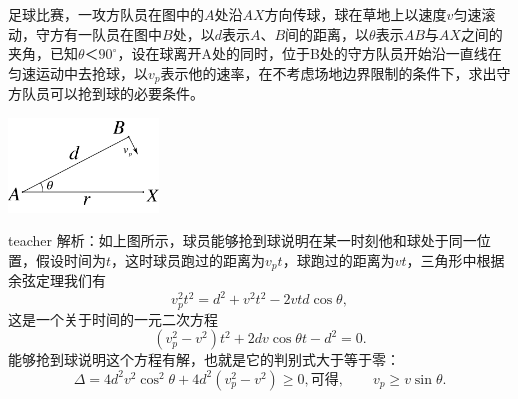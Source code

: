 \begin{example}
足球比赛，一攻方队员在图中的$A$处沿$AX$方向传球，球在草地上以速度$v$匀速滚动，守方有一队员在图中$B$处，以$d$表示$A$、$B$间的距离，以$\theta$表示$AB$与$AX$之间的夹角，已知$\theta ＜90^\circ$，设在球离开A处的同时，位于B处的守方队员开始沿一直线在匀速运动中去抢球，以$v_p$表示他的速率，在不考虑场地边界限制的条件下，求出守方队员可以抢到球的必要条件。

%
\begin{flushright}
\includegraphics[width = 0.3\textwidth]{images/motion-problem-football.pdf}
\end{flushright}
\begin{taggedblock}{teacher}
\vspace*{4cm}
\noindent
解析：如上图所示，球员能够抢到球说明在某一时刻他和球处于同一位置，假设时间为$t$，这时球员跑过的距离为$v_pt$，球跑过的距离为$vt$，三角形中根据余弦定理我们有
\[
v_p^2t^2 = d^2+v^2t^2-2vtd\cos\theta,
\]
这是一个关于时间的一元二次方程
\[
(v_p^2-v^2)t^2+2dv\cos\theta t-d^2=0.
\]
能够抢到球说明这个方程有解，也就是它的判别式大于等于零：
\[
\Delta  = 4d^2v^2\cos^2\theta+4d^2(v_p^2-v^2)\ge 0,\text{可得},\qquad v_p\ge v\sin\theta.
\]
\end{taggedblock}
\end{example}

